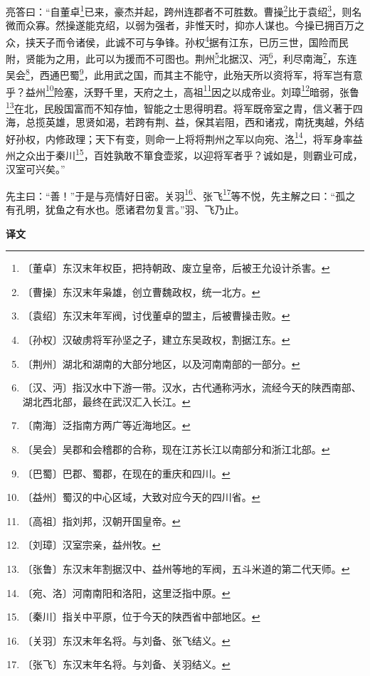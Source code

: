 \documentclass[12pt,UTF-8,openany,a4]{ctexbook}
\begin{document}
\begin{large}
    亮答曰：“自董卓\footnote{〔董卓〕\yiwen 东汉末年权臣，把持朝政、废立皇帝，后被王允设计杀害。}已来，豪杰并起，跨州连郡者不可胜数。曹操\footnote{〔曹操〕\yiwen 东汉末年枭雄，创立曹魏政权，统一北方。}比于袁绍\footnote{〔袁绍〕\yiwen 东汉末年军阀，讨伐董卓的盟主，后被曹操击败。}，则名微而众寡。然操遂能克绍，以弱为强者，非惟天时，抑亦人谋也。今操已拥百万之众，挟天子而令诸侯，此诚不可与争锋。孙权\footnote{〔孙权〕\yiwen 汉破虏将军孙坚之子，建立东吴政权，割据江东。}据有江东，已历三世，国险而民附，贤能为之用，此可以为援而不可图也。荆州\footnote{〔荆州〕\yiwen 湖北和湖南的大部分地区，以及河南南部的一部分。}北据汉、沔\footnote{〔汉、沔〕\yiwen 指汉水中下游一带。汉水，古代通称沔水，流经今天的陕西南部、湖北西北部，最终在武汉汇入长江。}，利尽南海\footnote{〔南海〕\yiwen 泛指南方两广等近海地区。}，东连吴会\footnote{〔吴会〕\yiwen 吴郡和会稽郡的合称，现在江苏长江以南部分和浙江北部。}，西通巴蜀\footnote{〔巴蜀〕\yiwen 巴郡、蜀郡，在现在的重庆和四川。}，此用武之国，而其主不能守，此殆天所以资将军，将军岂有意乎？益州\footnote{〔益州〕\yiwen 蜀汉的中心区域，大致对应今天的四川省。}险塞，沃野千里，天府之土，高祖\footnote{〔高祖〕\yiwen 指刘邦，汉朝开国皇帝。}因之以成帝业。刘璋\footnote{〔刘璋〕\yiwen 汉室宗亲，益州牧。}暗弱，张鲁\footnote{〔张鲁〕\yiwen 东汉末年割据汉中、益州等地的军阀，五斗米道的第二代天师。}在北，民殷国富而不知存恤，智能之士思得明君。将军既帝室之胄，信义著于四海，总揽英雄，思贤如渴，若跨有荆、益，保其岩阻，西和诸戎，南抚夷越，外结好孙权，内修政理；天下有变，则命一上将将荆州之军以向宛、洛\footnote{〔宛、洛〕\yiwen 河南南阳和洛阳，这里泛指中原。}，将军身率益州之众出于秦川\footnote{〔秦川〕\yiwen 指关中平原，位于今天的陕西省中部地区。}，百姓孰敢不箪食壶浆，以迎将军者乎？诚如是，则霸业可成，汉室可兴矣。”
    
    先主曰：“善！”于是与亮情好日密。关羽\footnote{〔关羽〕\yiwen 东汉末年名将。与刘备、张飞结义。}、张飞\footnote{〔张飞〕\yiwen 东汉末年名将。与刘备、关羽结义。}等不悦，先主解之曰：“孤之有孔明，犹鱼之有水也。愿诸君勿复言。”羽、飞乃止。
\end{large}


\newpage

\begin{Large}
    \noindent\textbf{译文}
\end{Large}


\vspace{1em}
\end{document}

